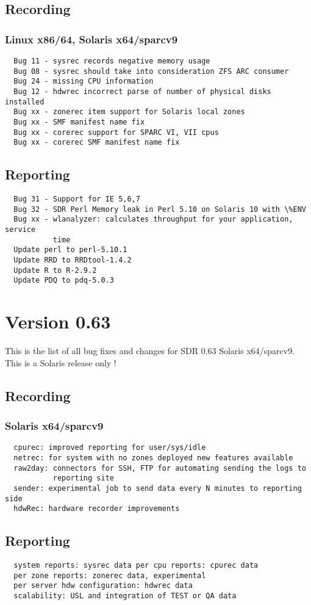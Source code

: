 \subsection*{Recording}
\subsubsection*{Linux x86/64, Solaris x64/sparcv9}

\begin{verbatim}
  Bug 11 - sysrec records negative memory usage
  Bug 08 - sysrec should take into consideration ZFS ARC consumer
  Bug 24 - missing CPU information
  Bug 12 - hdwrec incorrect parse of number of physical disks installed
  Bug xx - zonerec item support for Solaris local zones
  Bug xx - SMF manifest name fix
  Bug xx - corerec support for SPARC VI, VII cpus
  Bug xx - corerec SMF manifest name fix
\end{verbatim}


\subsection*{Reporting}

\begin{verbatim}
  Bug 31 - Support for IE 5,6,7
  Bug 32 - SDR Perl Memory leak in Perl 5.10 on Solaris 10 with \%ENV
  Bug xx - wlanalyzer: calculates throughput for your application, service
           time
  Update perl to perl-5.10.1
  Update RRD to RRDtool-1.4.2
  Update R to R-2.9.2
  Update PDQ to pdq-5.0.3
\end{verbatim}


\section{Version 0.63}
\noindent
This is the list of all bug fixes and changes for SDR 0.63 Solaris x64/sparcv9.
This is a Solaris release only !

\subsection*{Recording}
\subsubsection*{Solaris x64/sparcv9}

\begin{verbatim}
  cpurec: improved reporting for user/sys/idle
  netrec: for system with no zones deployed new features available
  raw2day: connectors for SSH, FTP for automating sending the logs to 
           reporting site
  sender: experimental job to send data every N minutes to reporting side
  hdwRec: hardware recorder improvements
\end{verbatim}


\subsection*{Reporting}

\begin{verbatim}
  system reports: sysrec data per cpu reports: cpurec data
  per zone reports: zonerec data, experimental
  per server hdw configuration: hdwrec data
  scalability: USL and integration of TEST or QA data
\end{verbatim}

\endinput
